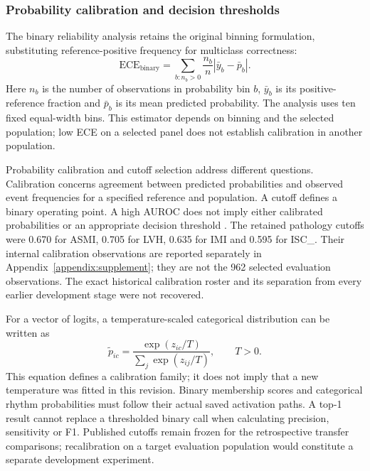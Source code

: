 \subsubsection{Probability calibration and decision thresholds}
\label{sec:calibration}
The binary reliability analysis retains the original binning formulation, substituting reference-positive frequency for multiclass correctness:
\begin{equation}
\mathrm{ECE}_{\mathrm{binary}}=\sum_{b:n_b>0}\frac{n_b}{n}|\bar y_b-\bar p_b|.
\end{equation}
Here $n_b$ is the number of observations in probability bin $b$, $\bar y_b$ is its positive-reference fraction and $\bar p_b$ is its mean predicted probability. The analysis uses ten fixed equal-width bins. This estimator depends on binning and the selected population; low ECE on a selected panel does not establish calibration in another population.

Probability calibration and cutoff selection address different questions. Calibration concerns agreement between predicted probabilities and observed event frequencies for a specified reference and population. A cutoff defines a binary operating point. A high AUROC does not imply either calibrated probabilities or an appropriate decision threshold \citep{Guo2017Calibration}. The retained pathology cutoffs were 0.670 for ASMI, 0.705 for LVH, 0.635 for IMI and 0.595 for ISC\_. Their internal calibration observations are reported separately in Appendix~\ref{appendix:supplement}; they are not the 962 selected evaluation observations. The exact historical calibration roster and its separation from every earlier development stage were not recovered.

For a vector of logits, a temperature-scaled categorical distribution can be written as
\begin{equation}
\tilde p_{ic}=\frac{\exp(z_{ic}/T)}{\sum_j\exp(z_{ij}/T)},\qquad T>0.
\label{eq:temperature}
\end{equation}
This equation defines a calibration family; it does not imply that a new temperature was fitted in this revision. Binary membership scores and categorical rhythm probabilities must follow their actual saved activation paths. A top-1 result cannot replace a thresholded binary call when calculating precision, sensitivity or F1. Published cutoffs remain frozen for the retrospective transfer comparisons; recalibration on a target evaluation population would constitute a separate development experiment.

